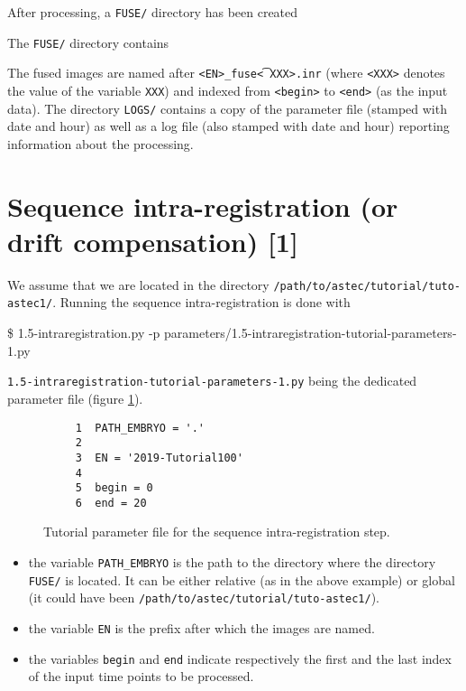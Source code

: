 After processing, a \texttt{FUSE/} directory has been created

\mbox{}
\mbox{}

The \texttt{FUSE/} directory contains 
\mbox{}
\mbox{}

The fused images are named after \texttt{<EN>\_fuse\t<XXX>.inr} (where \texttt{<XXX>}
denotes the value of the variable \texttt{XXX}) and indexed from
\texttt{<begin>} to \texttt{<end>} (as the input data). The directory \texttt{LOGS/} contains
a copy of the parameter file (stamped with date and hour) as well as a
log file (also stamped with date and hour) reporting information about
the processing.





\section{Sequence intra-registration (or drift compensation) [1]}
\label{sec:tutorial:intra:registration:1}

We assume that we are located in the directory
\texttt{/path/to/astec/tutorial/tuto-astec1/}. Running the sequence intra-registration is
done with
\begin{code}{0.8}
  \$ 1.5-intraregistration.py -p parameters/1.5-intraregistration-tutorial-parameters-1.py 
\end{code}
\texttt{1.5-intraregistration-tutorial-parameters-1.py} being the
dedicated parameter file  (figure \ref{fig:tutorial:parameter:intra:registration:1}).

\begin{figure}
\begin{framed}
\begin{verbatim}
     1	PATH_EMBRYO = '.'
     2	
     3	EN = '2019-Tutorial100'
     4	
     5	begin = 0
     6	end = 20
\end{verbatim}
\end{framed}
\caption{\label{fig:tutorial:parameter:intra:registration:1} Tutorial
  parameter file for the sequence intra-registration step.}
\end{figure}

\begin{itemize}
  \item the variable \texttt{PATH\_EMBRYO} is the path to the directory where
    the directory \texttt{FUSE/} is located. It can be either relative (as in the
    above example) or
    global (it could have been \texttt{/path/to/astec/tutorial/tuto-astec1/}).
  \item the variable \texttt{EN} is the prefix after which the  images
    are named. 
  \item the variables \texttt{begin} and \texttt{end} indicate respectively the
    first and the last index of the input time points to be processed.
\end{itemize}

